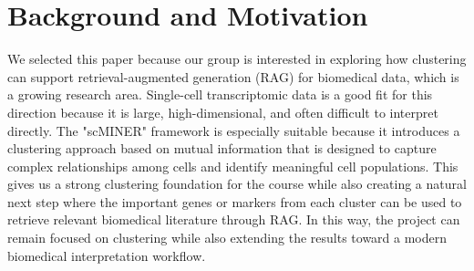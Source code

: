 \section{Background and Motivation}
We selected this paper because our group is interested in exploring how clustering can support retrieval-augmented generation (RAG) for biomedical data, which is a growing research area. Single-cell transcriptomic data is a good fit for this direction because it is large, high-dimensional, and often difficult to interpret directly. The "scMINER" framework is especially suitable because it introduces a clustering approach based on mutual information that is designed to capture complex relationships among cells and identify meaningful cell populations. This gives us a strong clustering foundation for the course while also creating a natural next step where the important genes or markers from each cluster can be used to retrieve relevant biomedical literature through RAG. In this way, the project can remain focused on clustering while also extending the results toward a modern biomedical interpretation workflow.
